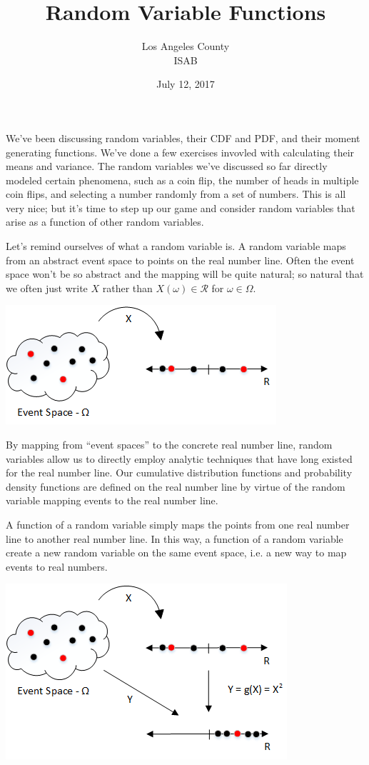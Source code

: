 \documentclass[]{article}
\title{Random Variable Functions}
\author{Los Angeles County\\ISAB}
\date{July 12, 2017}
\begin{document}
\maketitle

We've been discussing random variables, their CDF and PDF, and their
moment generating functions.  We've done a few exercises invovled with
calculating their means and variance.  The random variables we've discussed
so far directly modeled certain phenomena, such as a coin flip, the number
of heads in multiple coin flips, and selecting a number randomly from a set
of numbers.  This is all very nice; but it's time to step up our game and
consider random variables that arise as a function of other random variables.

Let's remind ourselves of what a random variable is.
A random variable maps from an abstract event space to points on
the real number line.  Often the event space won't be so abstract
and the mapping will be quite natural; so natural that we often just
write $X$ rather than
$X(\omega) \in \mathcal{R}$ for $\omega \in \Omega$.

\includegraphics[width=\linewidth]{rv1.png}

By mapping from ``event spaces'' to the concrete real number line,
random variables allow us to directly employ analytic techniques
that have long existed for the real number line.  Our
cumulative distribution functions and probability density functions
are defined on the real number line by virtue of the random variable
mapping events to the real number line.

A function of a random variable simply maps the points from one
real number line to another real number line.  In this way, a function
of a random variable create a new random variable on the same event
space, i.e. a new way to map events to real numbers.

\includegraphics[width=\linewidth]{rv2.png}
\end{document}
